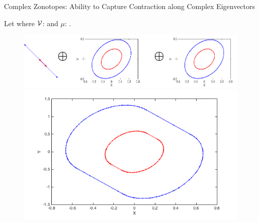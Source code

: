 
\begin{frame}{Complex Zonotopes: Ability to Capture Contraction along Complex Eigenvectors}

\begin{block}{}
{\small
Let  where
$\mathcal{V}$:  and $\mu$: .
}

\begin{enumerate}
\end{enumerate}
%
\end{block}
%
\begin{figure}
\center
\includegraphics[scale=0.25]{figures/CZtopes/eigcontraction.png}\\
\includegraphics[scale=0.25]{figures/CZtopes/contraction-zonotope.png}
\end{figure}
%
\end{frame}

